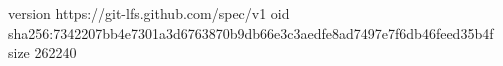 version https://git-lfs.github.com/spec/v1
oid sha256:7342207bb4e7301a3d6763870b9db66e3c3aedfe8ad7497e7f6db46feed35b4f
size 262240
